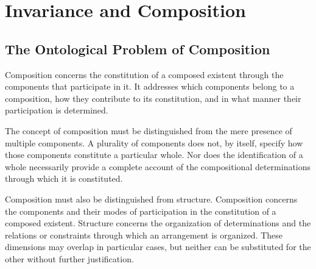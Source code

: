 %
%
%
%
%

\section{Invariance and Composition}
\label{sec:invariance-and-composition}

\subsection{The Ontological Problem of Composition}

Composition concerns the constitution of a composed existent
through the components that participate in it. It addresses
which components belong to a composition, how they contribute
to its constitution, and in what manner their participation
is determined.

The concept of composition must be distinguished from the
mere presence of multiple components. A plurality of components
does not, by itself, specify how those components constitute
a particular whole. Nor does the identification of a whole
necessarily provide a complete account of the compositional
determinations through which it is constituted.

Composition must also be distinguished from structure.
Composition concerns the components and their modes of
participation in the constitution of a composed existent.
Structure concerns the organization of determinations and
the relations or constraints through which an arrangement
is organized. These dimensions may overlap in particular
cases, but neither can be substituted for the other without
further justification.

